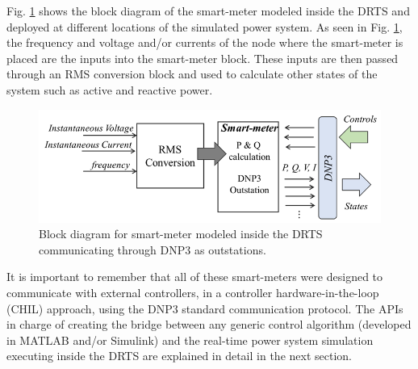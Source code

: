 Fig. \ref{fig:sm_meter} shows the block diagram of the smart-meter modeled inside the DRTS and deployed at different locations of the simulated power system. As seen in Fig. \ref{fig:sm_meter}, the frequency and voltage and/or currents of the node where the smart-meter is placed are the inputs into the smart-meter block. These inputs are then passed through an RMS conversion block and used to calculate other states of the system such as active and reactive power.

\begin{figure}[!ht]
    \centering
    \includegraphics[width = \linewidth]{figs/SMART_METER.png}
    \caption{Block diagram for smart-meter modeled inside the DRTS communicating through DNP3 as outstations.}
    \label{fig:sm_meter}
\end{figure}



It is important to remember that all of these smart-meters were designed to communicate with external controllers, in a controller hardware-in-the-loop (CHIL) approach, using the DNP3 standard communication protocol. The APIs in charge of creating the bridge between any generic control algorithm (developed in MATLAB and/or Simulink) and the real-time power system simulation executing inside the DRTS are explained in detail in the next section. 


